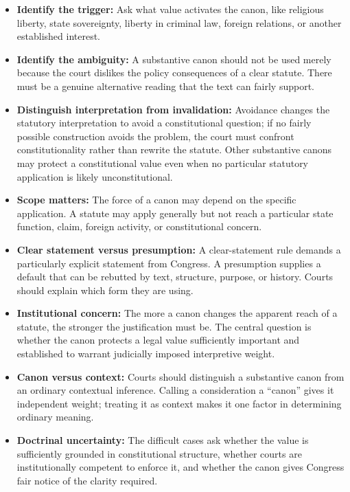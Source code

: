 \documentclass[11pt]{tex/lawoutline}
\begin{document}
\begin{itemize}
    \item \textbf{Identify the trigger:} Ask what value activates the canon, like religious liberty, state sovereignty, liberty in criminal law, foreign relations, or another established interest.
    \item \textbf{Identify the ambiguity:} A substantive canon should not be used merely because the court dislikes the policy consequences of a clear statute. There must be a genuine alternative reading that the text can fairly support.
    \item \textbf{Distinguish interpretation from invalidation:} Avoidance changes the statutory interpretation to avoid a constitutional question; if no fairly possible construction avoids the problem, the court must confront constitutionality rather than rewrite the statute. Other substantive canons may protect a constitutional value even when no particular statutory application is likely unconstitutional.
    \item \textbf{Scope matters:} The force of a canon may depend on the specific application. A statute may apply generally but not reach a particular state function, claim, foreign activity, or constitutional concern.
    \item \textbf{Clear statement versus presumption:} A clear-statement rule demands a particularly explicit statement from Congress. A presumption supplies a default that can be rebutted by text, structure, purpose, or history. Courts should explain which form they are using.
    \item \textbf{Institutional concern:} The more a canon changes the apparent reach of a statute, the stronger the justification must be. The central question is whether the canon protects a legal value sufficiently important and established to warrant judicially imposed interpretive weight.
    \item \textbf{Canon versus context:} Courts should distinguish a substantive canon from an ordinary contextual inference. Calling a consideration a ``canon'' gives it independent weight; treating it as context makes it one factor in determining ordinary meaning.
    \item \textbf{Doctrinal uncertainty:} The difficult cases ask whether the value is sufficiently grounded in constitutional structure, whether courts are institutionally competent to enforce it, and whether the canon gives Congress fair notice of the clarity required.
\end{itemize}
\end{document}

